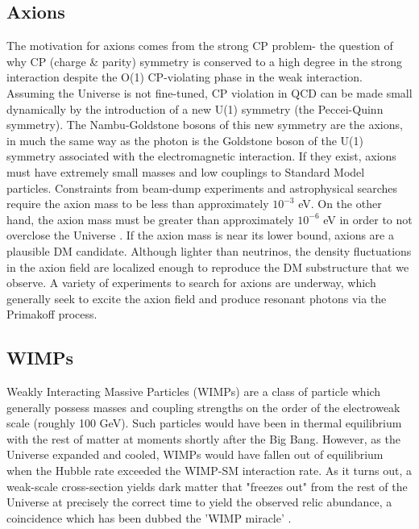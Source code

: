 \subsection{Axions}
The motivation for axions comes from the strong CP problem- the question of why CP (charge \& parity) symmetry is conserved to a high degree in the strong interaction despite the O(1) CP-violating phase in the weak interaction. Assuming the Universe is not fine-tuned, CP violation in QCD can be made small dynamically by the introduction of a new U(1) symmetry (the Peccei-Quinn symmetry). The Nambu-Goldstone bosons of this new symmetry are the axions, in much the same way as the photon is the Goldstone boson of the U(1) symmetry associated with the electromagnetic interaction. 
If they exist, axions must have extremely small masses and low couplings to Standard Model particles. Constraints from beam-dump experiments and astrophysical searches require the axion mass to be less than approximately $10^{-3}$ eV. On the other hand, the axion mass must be greater than approximately $10^{-6}$ eV in order to not overclose the Universe \cite{bertone_particle_2010}. If the axion mass is near its lower bound, axions are a plausible DM candidate. Although lighter than neutrinos, the density fluctuations in the axion field are localized enough to reproduce the DM substructure that we observe. A variety of experiments to search for axions are underway, which generally seek to excite the axion field and produce resonant photons via the Primakoff process. 

\subsection{WIMPs}
Weakly Interacting Massive Particles (WIMPs) are a class of particle which generally possess masses and coupling strengths on the order of the electroweak scale (roughly 100 GeV). 
Such particles would have been in thermal equilibrium with the rest of matter at moments shortly after the Big Bang.
However, as the Universe expanded and cooled, WIMPs would have fallen out of equilibrium when the Hubble rate exceeded the WIMP-SM interaction rate. 
As it turns out, a weak-scale cross-section yields dark matter that "freezes out" from the rest of the Universe at precisely the correct time to yield the observed relic abundance, a coincidence which has been dubbed the 'WIMP miracle' \cite{bertone_particle_2010}.

